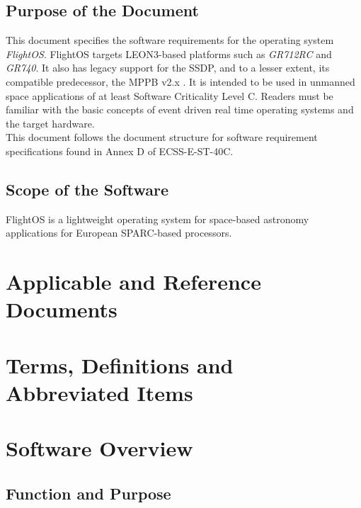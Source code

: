 \section{Purpose of the Document}

This document specifies the software requirements for the operating system
\emph{FlightOS}. FlightOS targets \gls{LEON3}-based platforms such as
\emph{GR712RC} and \emph{GR740}. It also has legacy support for the \gls{SSDP},
and to a lesser extent, its compatible predecessor, the \gls{MPPB} v2.x \cite{MPPB}.
It is intended to be used in unmanned space applications of at least
Software Criticality Level C. Readers must be familiar with the basic concepts
of event driven real time operating systems and the target hardware. \\

\noindent
This document follows the document structure for software requirement
specifications found in Annex D of ECSS-E-ST-40C\cite{ECSS40C}.

\section{Scope of the Software}

FlightOS is a lightweight operating system for space-based astronomy applications
for European \gls{SPARC}-based processors.


\chapter{Applicable and Reference Documents} %

\printbibliography[heading=none]


\chapter{Terms, Definitions and Abbreviated Items}
\printglossary[type=acronym]
\printglossary[type=main, style=altlist]



\chapter{Software Overview}

\section{Function and Purpose}

